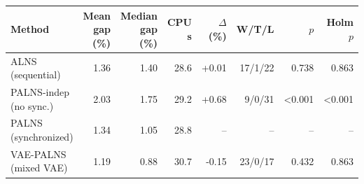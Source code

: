 \begin{tabular}{lrrrrrrr}
\toprule
Method & Mean gap (\%) & Median gap (\%) & CPU s & $\Delta$ (\%) & W/T/L & $p$ & Holm $p$ \\
\midrule
ALNS (sequential) & 1.36 & 1.40 & 28.6 & +0.01 & 17/1/22 & 0.738 & 0.863 \\
PALNS-indep (no sync.) & 2.03 & 1.75 & 29.2 & +0.68 & 9/0/31 & <0.001 & <0.001 \\
PALNS (synchronized) & 1.34 & 1.05 & 28.8 & -- & -- & -- & -- \\
VAE-PALNS (mixed VAE) & 1.19 & 0.88 & 30.7 & -0.15 & 23/0/17 & 0.432 & 0.863 \\
\bottomrule
\end{tabular}
